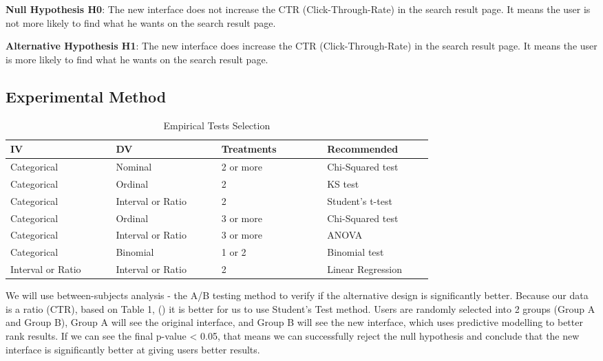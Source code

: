 \documentclass[
	letterpaper, %
]{jdf}
\begin{document}
\textbf{Null Hypothesis H0}: The new interface does not increase the CTR (Click-Through-Rate) in the search result page. It means the user is not more likely to find what he wants on the search result page.

\textbf{Alternative Hypothesis H1}: The new interface does increase the CTR (Click-Through-Rate) in the search result page. It means the user is more likely to find what he wants on the search result page.

\subsection{Experimental Method}

\begin{table}[h] %
	\caption{Empirical Tests Selection}
	\small %
	\centering %
	\begin{tabular}{L{0.2\linewidth} L{0.2\linewidth} L{0.2\linewidth} L{0.2\linewidth}}
		\textbf{IV} & \textbf{DV} & \textbf{Treatments} & \textbf{Recommended}\\
		\toprule[0.5pt]
		Categorical & Nominal & 2 or more & Chi-Squared test \\
		\midrule
		Categorical & Ordinal & 2 & KS test \\
		\midrule
		Categorical & Interval or Ratio & 2 & Student's t-test \\
		\midrule
		Categorical & Ordinal & 3 or more & Chi-Squared test \\
		\midrule
		Categorical & Interval or Ratio & 3 or more & ANOVA \\
		\midrule
		Categorical & Binomial & 1 or 2 & Binomial test \\
		\midrule
		Interval or Ratio & Interval or Ratio & 2 & Linear Regression \\
	\end{tabular}
\end{table}


We will use between-subjects analysis - the A/B testing method to verify if the alternative design is significantly better. Because our data is a ratio (CTR), based on Table 1, (\cite{joyner2016b}) it is better for us to use Student's Test method. Users are randomly selected into 2 groups (Group A and Group B), Group A will see the original interface, and Group B will see the new interface, which uses predictive modelling to better rank results. If we can see the final p-value < 0.05, that means we can successfully reject the null hypothesis and conclude that the new interface is significantly better at giving users better results.
\end{document}
